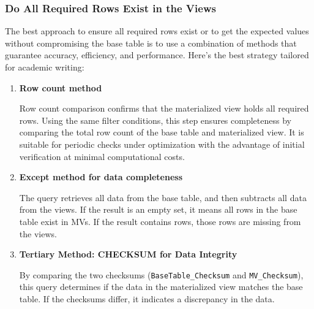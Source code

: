 \subsubsection{Do All Required Rows Exist in the Views }\label{Output_checking}

 The best approach to ensure all required rows exist or to get the expected values without compromising the base table is to use a combination of methods that guarantee accuracy, efficiency, and performance. Here's the best strategy tailored for academic writing:
\begin{enumerate}
    \item \textbf{Row count method} \vspace{.4cm}

    
    
Row count comparison confirms that the materialized view holds all required rows. Using the same filter conditions, this step ensures completeness by comparing the total row count of the base table and materialized view. It is suitable for periodic checks under optimization with the advantage of initial verification at minimal computational costs.
    
    \item \textbf{Except method for data completeness} \vspace{.4cm}

    

The query retrieves all data from the base table, and then subtracts all data from the views. If the result is an empty set, it means all rows in the base table exist in MVs. If the result contains rows, those rows are missing from the views. 
    
    \item \textbf{Tertiary Method: CHECKSUM for Data Integrity} \vspace{.4cm}
    
    
    
    By comparing the two checksums (\texttt{BaseTable\_Checksum} and \texttt{MV\_Checksum}), this query determines if the data in the materialized view matches the base table. If the checksums differ, it indicates a discrepancy in the data.
\end{enumerate}
 




 

